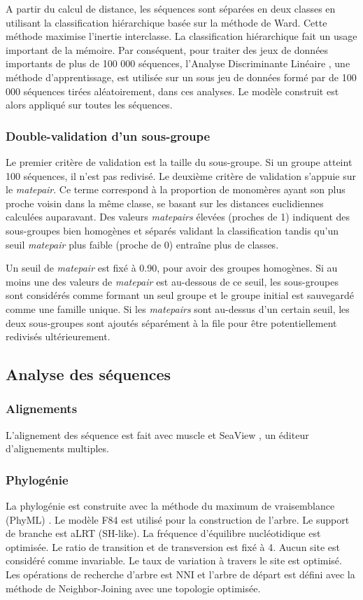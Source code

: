 \documentclass[12pt,a4paper]{article}
\begin{document}
A partir du calcul de distance, les séquences sont séparées en deux classes en utilisant la classification hiérarchique basée sur la méthode de Ward. Cette méthode maximise l’inertie interclasse. La classification hiérarchique fait un usage important de la mémoire. Par conséquent, pour traiter des jeux de données importants de plus de 100 000 séquences, l’Analyse Discriminante Linéaire , une méthode d’apprentissage, est utilisée sur un sous jeu de données formé par de 100 000 séquences tirées aléatoirement, dans ces analyses. Le modèle construit est alors appliqué sur toutes les séquences.

	\subsubsection{Double-validation d'un sous-groupe}
Le premier critère de validation est la taille du sous-groupe. Si un groupe atteint 100 séquences, il n'est pas redivisé. Le deuxième critère de validation s'appuie sur le \textit{matepair}. Ce terme correspond à la proportion de monomères ayant son plus proche voisin dans la même classe, se basant sur les distances euclidiennes calculées auparavant. Des valeurs \textit{matepairs} élevées (proches de 1) indiquent des sous-groupes bien homogènes et séparés validant la classification tandis qu’un seuil \textit{matepair} plus faible (proche de 0) entraîne plus de classes.

Un seuil de \textit{matepair} est fixé à 0.90, pour avoir des groupes homogènes. Si au moins une des valeurs de \textit{matepair} est au-dessous de ce seuil, les sous-groupes sont considérés comme formant un seul groupe et le groupe initial est sauvegardé comme une famille unique. Si les \textit{matepairs} sont au-dessus d’un certain seuil, les deux sous-groupes sont ajoutés séparément à la file pour être potentiellement redivisés ultérieurement.

	\subsection{Analyse des séquences}
		\subsubsection{Alignements}
L'alignement des séquence est fait avec muscle \cite{Edgar2004} et SeaView \cite{Gouy2009}, un éditeur d'alignements multiples. 
	\subsubsection{Phylogénie}
La phylogénie est construite avec la méthode du maximum de vraisemblance (PhyML) \cite{Guindon2009a}. Le modèle F84 est utilisé pour la construction de l'arbre. Le support de branche est aLRT (SH-like). La fréquence d'équilibre nucléotidique est optimisée. Le ratio de transition et de transversion est fixé à 4. Aucun site est considéré comme invariable. Le taux de variation à travers le site est optimisé. Les opérations de recherche d'arbre est NNI et l'arbre de départ est défini avec la méthode de Neighbor-Joining \cite{Saitou1987} avec une topologie optimisée.
\end{document}
